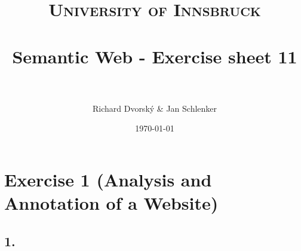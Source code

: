 \documentclass[paper=a4, fontsize=12pt]{scrartcl} %
\title{	
\normalfont \normalsize 
\textsc{University of Innsbruck} \\ [25pt] %
\horrule{0.5pt} \\[0.4cm] %
\huge Semantic Web - Exercise sheet 11 \\ %
\horrule{2pt} \\[0.5cm] %
}
\author{Richard Dvorský \& Jan Schlenker} %
\date{\normalsize\today} %
\begin{document}
\maketitle %


\section*{Exercise 1 (Analysis and Annotation of a Website)}

\subsection*{1.}
\end{document}
